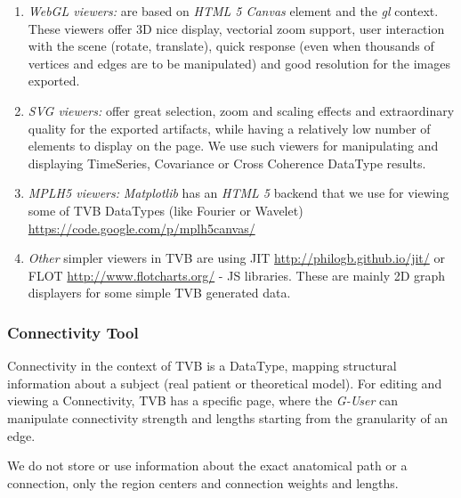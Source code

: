 \begin{enumerate}

	\item \emph{WebGL viewers:} are based on \emph{HTML 5 Canvas} element and the \emph{gl} context. 
	These viewers offer 3D nice display, vectorial zoom support, user interaction with the scene (rotate, translate), quick response 
	(even when thousands of vertices and edges are to be manipulated) and good resolution for the images exported.
	
	\item \emph{SVG viewers:} offer great selection, zoom and scaling effects and extraordinary quality for the exported artifacts, while having 
	a relatively low number of elements to display on the page. 
	We use such viewers for manipulating and displaying TimeSeries, Covariance or Cross Coherence DataType results.
	
	\item \emph{MPLH5 viewers:} \emph{Matplotlib} has an \emph{HTML 5} backend that we use for viewing some of TVB DataTypes (like Fourier or Wavelet)
	\url{https://code.google.com/p/mplh5canvas/}
	
	\item \emph{Other} simpler viewers in TVB are using JIT \url{http://philogb.github.io/jit/} or FLOT \url{http://www.flotcharts.org/} - JS libraries.
	These are mainly 2D graph displayers for some simple TVB generated data.

\end{enumerate}


	\subsubsection{Connectivity Tool}

Connectivity in the context of TVB is a DataType, mapping structural information about a subject (real patient or theoretical model).
For editing and viewing a Connectivity, TVB has a specific page, where the \emph{G-User} can manipulate connectivity strength and lengths 
starting from the granularity of an edge.

We do not store or use information about the exact anatomical path or a connection, only the region centers and connection weights and lengths.

